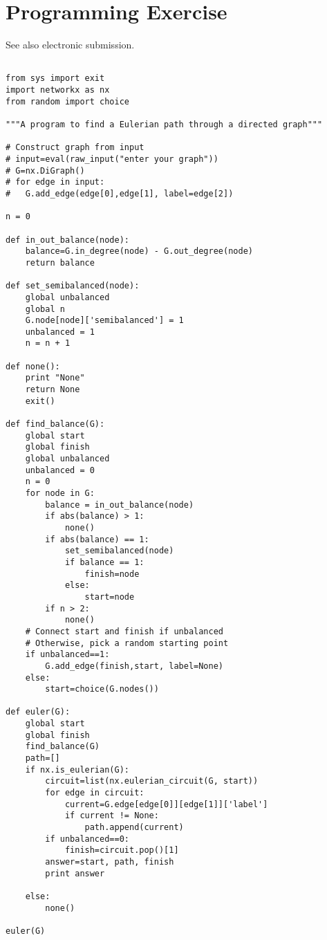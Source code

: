 \documentclass[12pt]{article}
\begin{document}
\section{Programming Exercise}
See also electronic submission.
\begin{lstlisting}

from sys import exit
import networkx as nx
from random import choice

"""A program to find a Eulerian path through a directed graph"""

# Construct graph from input
# input=eval(raw_input("enter your graph"))
# G=nx.DiGraph()
# for edge in input:
# 	G.add_edge(edge[0],edge[1], label=edge[2])

n = 0

def in_out_balance(node):
	balance=G.in_degree(node) - G.out_degree(node)
	return balance
	
def set_semibalanced(node):
	global unbalanced
	global n
	G.node[node]['semibalanced'] = 1
	unbalanced = 1
	n = n + 1

def none():
	print "None"
	return None
	exit()

def find_balance(G):
	global start
	global finish
	global unbalanced
	unbalanced = 0
	n = 0
	for node in G:
		balance = in_out_balance(node)
		if abs(balance) > 1:
			none()
		if abs(balance) == 1:
			set_semibalanced(node)
			if balance == 1:
				finish=node	
			else:
				start=node
		if n > 2:
			none()
	# Connect start and finish if unbalanced
	# Otherwise, pick a random starting point	
	if unbalanced==1:
		G.add_edge(finish,start, label=None)
	else:
		start=choice(G.nodes())

def euler(G):
	global start
	global finish
	find_balance(G)
	path=[]
	if nx.is_eulerian(G):
		circuit=list(nx.eulerian_circuit(G, start))
		for edge in circuit:
			current=G.edge[edge[0]][edge[1]]['label']
			if current != None:
				path.append(current)
		if unbalanced==0:
			finish=circuit.pop()[1]
		answer=start, path, finish
		print answer
		
	else: 
		none()

euler(G)


\end{lstlisting}
\end{document}
